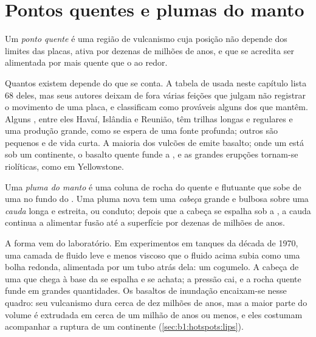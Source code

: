 \section{Pontos quentes e plumas do manto}\label{sec:b1:hotspots:plumes}

\begin{definition}\label{def:b1:hotspots:hotspot}
Um \emph{ponto quente} é uma região de vulcanismo cuja posição não depende dos limites das placas, ativa por dezenas de milhões de anos, e que se acredita ser alimentada por  mais quente que o  ao redor.
\end{definition}

Quantos  existem depende do que se conta. A tabela de  usada neste capítulo lista 68 deles, mas seus autores deixam de fora várias feições que julgam não registrar o movimento de uma placa, e classificam como prováveis alguns dos que mantêm. Alguns , entre eles Havaí, Islândia e Reunião, têm trilhas longas e regulares e uma produção grande, como se espera de uma fonte profunda; outros são pequenos e de vida curta. A maioria dos vulcões de  emite basalto; onde um  está sob um continente, o basalto quente funde a , e as grandes erupções tornam-se riolíticas, como em Yellowstone.

\begin{definition}\label{def:b1:hotspots:plume}
Uma \emph{pluma do manto} é uma coluna de rocha do  quente e flutuante que sobe de uma  no fundo do . Uma pluma nova tem uma \emph{cabeça} grande e bulbosa sobre uma \emph{cauda} longa e estreita, ou conduto; depois que a cabeça se espalha sob a , a cauda continua a alimentar fusão até a superfície por dezenas de milhões de anos.
\end{definition}

A forma vem do laboratório. Em experimentos em tanques da década de 1970, uma camada de fluido leve e menos viscoso que o fluido acima subia como uma bolha redonda, alimentada por um tubo atrás dela: um cogumelo. A cabeça de uma  que chega à base da  se espalha e se achata; a pressão cai, e a rocha quente funde em grandes quantidades. Os basaltos de inundação encaixam-se nesse quadro: seu vulcanismo dura cerca de dez milhões de anos, mas a maior parte do volume é extrudada em cerca de um milhão de anos ou menos, e eles costumam acompanhar a ruptura de um continente (\cref{sec:b1:hotspots:lips}).

